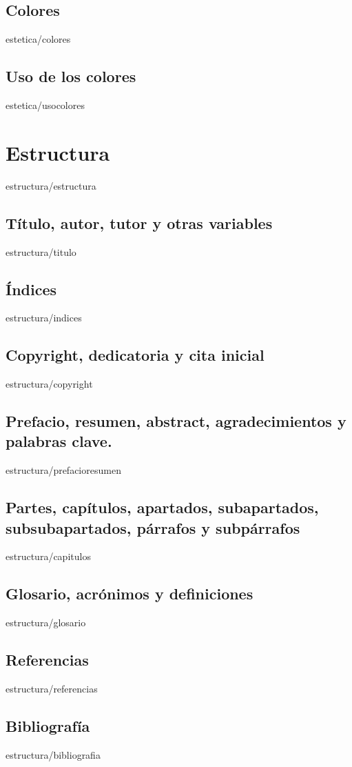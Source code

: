 \documentclass[epsbased,copyright,final,printable,covers,extendedindex,firstnumbered,tfg,gnuplot]{tfgtfmthesisuam}
\begin{document}
  \section{Colores\label{SEC:COLORES}}{estetica/colores}
  \section{Uso de los colores\label{SEC:USOCOLORES}}{estetica/usocolores}

\chapter{Estructura\label{CAP:ESTRUCTURA}}{estructura/estructura}
  \section{Título, autor, tutor y otras variables\label{SEC:VARIABLES}}{estructura/titulo}
  \section{Índices\label{SEC:INDICES}}{estructura/indices}
  \section{Copyright, dedicatoria y cita inicial\label{SEC:COPYRIGHT}}{estructura/copyright}
  \section[Prefacio, resumen ...]{Prefacio, resumen, abstract, agradecimientos y palabras clave.\label{SEC:PREFACIO}}{estructura/prefacioresumen}
  \section[Partes, capítulos ...]{Partes, capítulos, apartados, subapartados, subsubapartados, párrafos y subpárrafos\label{SEC:CAPITULOS}}{estructura/capitulos}
  \section[Glosario, acrónimos y definiciones]{Glosario, acrónimos y definiciones\label{SEC:GLOSARIO}}{estructura/glosario}
  \section{Referencias\label{SEC:REFERENCIAS}}{estructura/referencias}
  \section{Bibliografía\label{SEC:BIBLIOGRAFIA}}{estructura/bibliografia}
\end{document}
